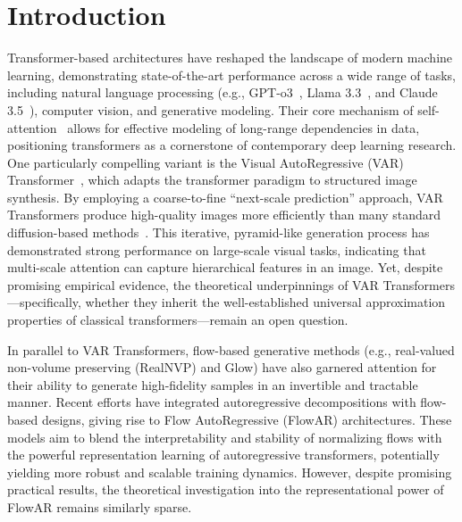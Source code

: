 \section{Introduction}
Transformer-based architectures have reshaped the landscape of modern machine learning, demonstrating state-of-the-art performance across a wide range of tasks, including natural language processing (e.g., GPT-o3~\cite{gpto1}, Llama 3.3~\cite{llama3_arxiv,llama3_blog}, and Claude 3.5~\cite{claude3_pdf}), computer vision, and generative modeling. Their core mechanism of self-attention~\cite{vsp+17} allows for effective modeling of long-range dependencies in data, positioning transformers as a cornerstone of contemporary deep learning research. 
One particularly compelling variant is the Visual AutoRegressive (VAR) Transformer~\cite{tjy+24}, which adapts the transformer paradigm to structured image synthesis. By employing a coarse-to-fine ``next-scale prediction'' approach, VAR Transformers produce high-quality images more efficiently than many standard diffusion-based methods~\cite{sme20}. This iterative, pyramid-like generation process has demonstrated strong performance on large-scale visual tasks, indicating that multi-scale attention can capture hierarchical features in an image. Yet, despite promising empirical evidence, the theoretical underpinnings of VAR Transformers—specifically, whether they inherit the well-established universal approximation properties of classical transformers—remain an open question.

In parallel to VAR Transformers, flow-based generative methods (e.g., real-valued non-volume preserving (RealNVP) and Glow) have also garnered attention for their ability to generate high-fidelity samples in an invertible and tractable manner. Recent efforts have integrated autoregressive decompositions with flow-based designs, giving rise to Flow AutoRegressive (FlowAR) \cite{ryh+24} architectures. These models aim to blend the interpretability and stability of normalizing flows with the powerful representation learning of autoregressive transformers, potentially yielding more robust and scalable training dynamics. However, despite promising practical results, the theoretical investigation into the representational power of FlowAR remains similarly sparse.

